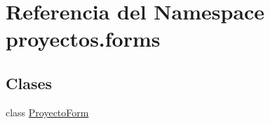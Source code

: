 \hypertarget{namespaceproyectos_1_1forms}{}\section{Referencia del Namespace proyectos.\+forms}
\label{namespaceproyectos_1_1forms}
\subsection*{Clases}
\begin{DoxyCompactItemize}
\item 
class \hyperlink{classproyectos_1_1forms_1_1_proyecto_form}{Proyecto\+Form}
\end{DoxyCompactItemize}
